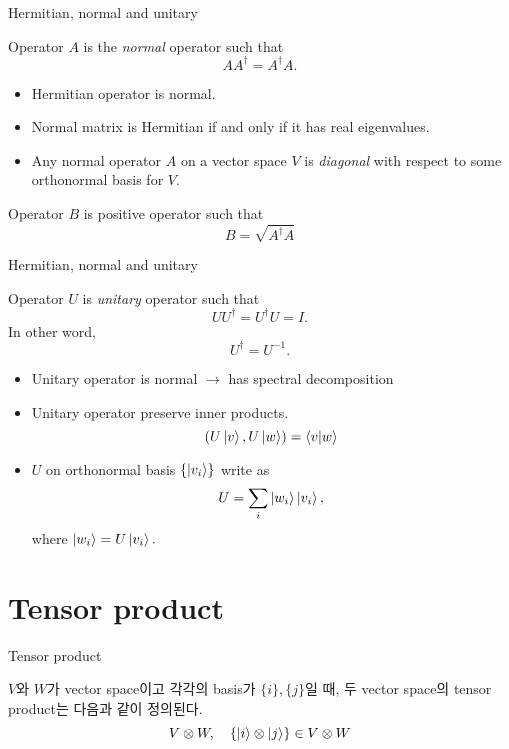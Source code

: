 \documentclass[9pt]{beamer}
\begin{document}
    \begin{frame}{Hermitian, normal and unitary}
        \begin{definition}[Normal]
            Operator $A$ is the \textit{normal} operator such that
            $$AA^\dagger = A^\dagger A.$$
        \end{definition}
        \begin{itemize}
            \item Hermitian operator is normal.
            \item Normal matrix is Hermitian if and only if it has real eigenvalues.
            \item Any normal operator $A$ on a vector space $V$ is \textit{diagonal} with respect to some orthonormal basis for $V$.
        \end{itemize}
        \begin{corollary}
            Operator $B$ is positive operator such that
            $$B = \sqrt{A^\dagger A}$$
        \end{corollary}
    \end{frame}

    \begin{frame}{Hermitian, normal and unitary}
        \begin{definition}[Unitary]
            Operator $U$ is \textit{unitary} operator such that
            $$UU^\dagger = U^\dagger U = I.$$
            In other word,
            $$U^\dagger = U^{-1}.$$
        \end{definition}
        \begin{itemize}
            \item Unitary operator is normal $\rightarrow$ has spectral decomposition
            \item Unitary operator preserve inner products. $$(U\ket v, U \ket w) = \braket{v|w}$$
            \item $U$ on orthonormal basis $\{\ket{v_i}\}$ write as
            $$U = \sum_i \ket{w_i} \ket{v_i},$$
            where $\ket{w_i} = U \ket{v_i}.$ 
        \end{itemize}
    \end{frame}

    \section{Tensor product}
    \begin{frame}{Tensor product}
        \begin{definition}
            $V$와 $W$가 vector space이고 각각의 basis가 $\{i\}, \{j\}$일 때, 두 vector space의 tensor product는 다음과 같이 정의된다.
            $$V \otimes W,\quad \{\ket i \otimes \ket j\}\in V\otimes W$$
        \end{definition}
    \end{frame}
\end{document}
